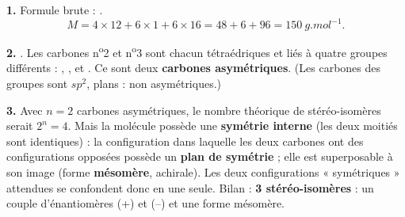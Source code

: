 \documentclass[11pt]{article}
\begin{document}
\begin{corrige}
\textbf{1.} Formule brute : .
\[
M = 4\times 12 + 6\times 1 + 6\times 16 = 48 + 6 + 96 = \SI{150}{g.mol^{-1}}.
\]

\textbf{2.} . Les carbones n\textsuperscript{o}2 et n\textsuperscript{o}3 sont chacun tétraédriques et liés à quatre groupes différents : , ,  et . Ce sont deux \textbf{carbones asymétriques}. (Les carbones des groupes  sont $sp^2$, plans : non asymétriques.)

\textbf{3.} Avec $n = 2$ carbones asymétriques, le nombre théorique de stéréo-isomères serait $2^n = 4$. Mais la molécule possède une \textbf{symétrie interne} (les deux moitiés  sont identiques) : la configuration dans laquelle les deux carbones ont des configurations opposées possède un \textbf{plan de symétrie} ; elle est superposable à son image (forme \textbf{mésomère}, achirale). Les deux configurations « symétriques » attendues se confondent donc en une seule. Bilan : \textbf{3 stéréo-isomères} : un couple d'énantiomères (+) et (--) et une forme mésomère.


\end{corrige}
\end{document}
